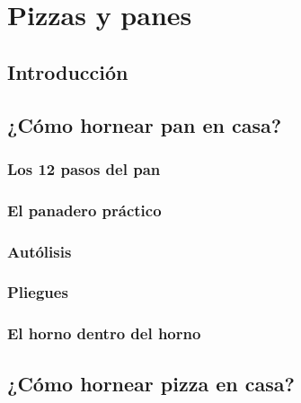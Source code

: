 \documentclass[%
a4paper,
twoside,
14pt
]{book}
\begin{document}
\chapter{Pizzas y panes}
\section{Introducción}
\section{¿Cómo hornear pan en casa?}
\subsection{Los 12 pasos del pan}
\subsection{El panadero práctico}
\subsection{Autólisis}
\subsection{Pliegues}
\subsection{El horno dentro del horno}
\section{¿Cómo hornear pizza en casa?}
\end{document}

